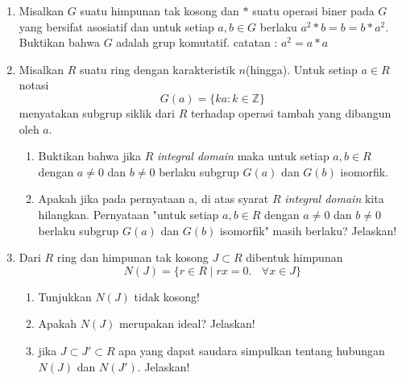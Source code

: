 \documentclass[12pt,twoside]{article}
\begin{document}
\begin{enumerate}
	\item Misalkan $G$ suatu himpunan tak kosong dan $*$ suatu operasi biner pada $G$ yang bersifat asosiatif dan untuk setiap $a,b\in G$ berlaku $a^2*b=b=b*a^2$. Buktikan bahwa $G$ adalah grup komutatif.
	      catatan : $a^2=a*a$
	\item Misalkan $R$ suatu ring dengan karakteristik $n$(hingga). Untuk setiap $a\in R$ notasi $$G(a)=\{ ka : k\in \mathbb{Z}\}$$ menyatakan subgrup siklik dari $R$ terhadap operasi tambah yang dibangun oleh $a$.
	      \begin{enumerate}
		      \item[(a)] Buktikan bahwa jika $R$ \textit{integral domain}  maka untuk setiap $a,b\in R$ dengan $a\neq 0$ dan $b\neq 0$ berlaku subgrup $G(a)$ dan $G(b)$ isomorfik.
		      \item[(b)] Apakah jika pada pernyataan a, di atas syarat $R$ \textit{integral domain} kita hilangkan. Pernyataan "untuk setiap $a,b\in R$ dengan $a\neq 0$ dan $b\neq 0$ berlaku subgrup $G(a)$ dan $G(b)$ isomorfik" masih berlaku? Jelaskan!

	      \end{enumerate}
	\item Dari $R$ ring dan himpunan tak kosong $J\subset R$ dibentuk himpunan $$N(J)=\{r\in R\mid rx=0.~~~~ \forall x\in J \}$$
	      \begin{enumerate}
		      \item[(a)] Tunjukkan $N(J)$ tidak kosong!
		      \item[(b)] Apakah $N(J)$ merupakan ideal? Jelaskan!
		      \item[(c)] jika  $J\subset J'\subset R$ apa yang dapat saudara simpulkan tentang hubungan $N(J)$ dan $N(J')$. Jelaskan!
	      \end{enumerate}
\end{enumerate}

\newpage
\end{document}
